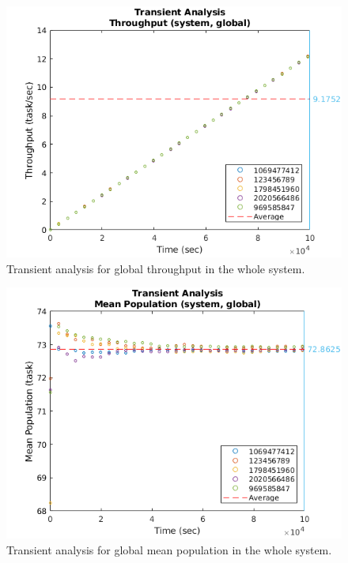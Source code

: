 \begin{figure}
	\includegraphics[width=\columnwidth]{fig/evaluation-transient-analysis-throughput}
	\caption{Transient analysis for global throughput in the whole system.}
	\label{fig:evaluation-transient-analysis-throughput}
\end{figure}

\begin{figure}
	\includegraphics[width=\columnwidth]{fig/evaluation-transient-analysis-mean-population}
	\caption{Transient analysis for global mean population in the whole system.}
	\label{fig:evaluation-transient-analysis-mean-population}
\end{figure}

